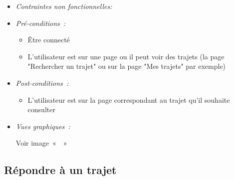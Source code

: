 \begin{itemize}
\item \textit{Contraintes non fonctionnelles:}

\item \textit{Pré-conditions~:}

    \begin{itemize}
        \item Être connecté
        \item L'utilisateur est sur une page ou il peut voir des trajets (la page "Rechercher un trajet" ou sur la page "Mes trajets" par exemple)
    \end{itemize}

\item \textit{Post-conditions~:}
     \begin{itemize}
        \item L'utilisateur est sur la page correspondant au trajet qu'il souhaite consulter
    \end{itemize}
    
    \item \textit{Vues graphiques~:}
    
    Voir image~«~~»

\end{itemize}


\subsection{Répondre à un trajet}\label{subsec:repondre-a-un-trajet}

